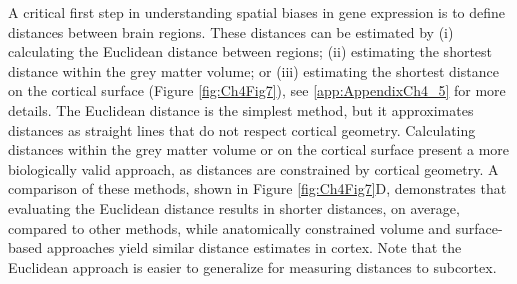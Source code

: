 A critical first step in understanding spatial biases in gene expression is to define distances between brain regions. These distances can be estimated by (i) calculating the Euclidean distance between regions; (ii) estimating the shortest distance within the grey matter volume; or (iii) estimating the shortest distance on the cortical surface (Figure \ref{fig:Ch4Fig7}), see \ref{app:AppendixCh4_5} for more details. The Euclidean distance is the simplest method, but it approximates distances as straight lines that do not respect cortical geometry. Calculating distances within the grey matter volume or on the cortical surface present a more biologically valid approach, as distances are constrained by cortical geometry. A comparison of these methods, shown in Figure \ref{fig:Ch4Fig7}D, demonstrates that evaluating the Euclidean distance results in shorter distances, on average, compared to other methods, while anatomically constrained volume and surface-based approaches yield similar distance estimates in cortex. Note that the Euclidean approach is easier to generalize for measuring distances to subcortex.

